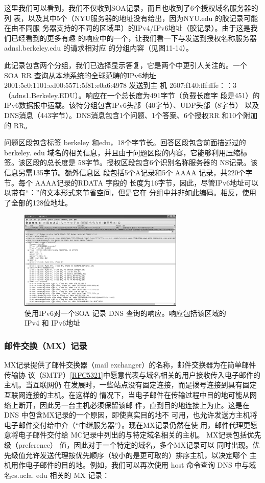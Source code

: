这里我们可以看到，我们不仅收到SOA记录，而且也收到了6个授权域名服务器的列
表，以及其中5个（NYU服务器的地址没有给出，因为NYU.edu 的胶记录可能在由不同服
务器支持的不同的区域里）的IPv4/IPv6地址（胶记录）。由于这是我们已经看到的更多有趣
的响应中的一个，让我们看一下与发送到授权名称服务器 adnsl.berkeley.edu 的请求相对应
的分组内容（见图11-14）。

此记录包含两个分组，我们已选择显示答复，它是两个中更引人关注的。一个 SOA RR
查询从本地系统的全球范畴的IPv6地址2001:5c0:1101:ed00:5571:5f81:e0a6:4978 发送到主
机 2607:f140:fff:fffe：：3 （adns1.Berkeley.EDU）。响应在一个总长度为491字节（负载长度字
段是451）的IPv6数据报中运载。该特分组包含IPv6头部（40字节）、UDP头部（8字节）
以及 DNS消息（443字节）。DNS消息包含1个问题、1个答案、6个授权RR 和10个附加
的 RR。

问题区段包含标签 berkeley 和edu，18个字节长。回答区段包含前面描述过的 berkeley.
edu 域名的相关信息，并且由于问题区段的内容，它能够利用压缩标签。该区段的总长度是
58字节。授权区段包含6个识别名称服务器的 NS记录。该信息另需135字节。额外信息区
段包括5个A记录和5个 AAAA 记录，共220个字节。每个 AAAA记录的RDATA 字段的
长度为16字节，因此，尽管IPv6地址可以以带有“：”的文本形式来节省空间，但是它在
分组中并非如此编码。相反，使用了全部的128位地址。

\begin{figure}[!htb]
    \centering
	\includegraphics[width=0.7\textwidth]{imgs/11/11-14.png}
	\caption{使用IPv6对一个SOA 记录 DNS 查询的响应。响应包括该区域的 IPv4 和 IPv6地址}
\end{figure}

\subsubsection{邮件交换（MX）记录}

MX记录提供了邮件交换器（mail exchanger）的名称，邮件交换器为在简单邮件传输协
议（SMTP）\href{https://www.rfc-editor.org/rfc/rfc5321}{[RFC5321]}中愿意代表与域名相关的用户接收传入电子邮件的主机。当互联网仍
在发展时，一些站点没有固定连接，而是拨号连接到具有固定互联网连接的主机。在这样的
情况下，当电子邮件在传输过程中目的地可能从网络上断开，因此另一台主机必须保留该邮
件，直到目的地连接上为止。这是在 DNS 中包含MX记录的一个原因，即使真实目的地不
可用，也允许发送方主机将电子邮件交付给中介（“中继服务器”）。现在MX记录仍然在使
用，邮件代理更愿意将电子邮件交付给 MC记录中列出的与特定域名相关的主机。
MX记录包括优先级（preference） 值，因此对于一个特定的域名，多个MX记录可以
同时出现。优先级值允许发送代理按优先顺序（较小的是更可取的）排序主机，以决定哪个
主机用作电子邮件的目的地。例如，我们可以再次使用 host 命令查询 DNS 中与域名cs.ucla.
edu 相关的 MX 记录：

